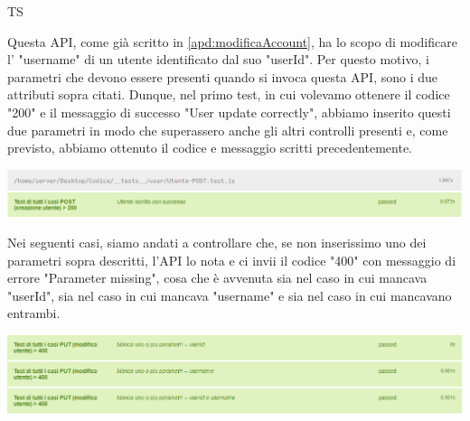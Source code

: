 \begin{listaPersonale}{TS}
\begin{center}
                \end{center}
                Questa API, come già scritto in \ref{apd:modificaAccount}, ha lo scopo di modificare l' "username" di un utente identificato dal suo "userId". Per questo motivo, i parametri che devono essere presenti quando si invoca questa API, sono i due attributi sopra citati. Dunque, nel primo test, in cui volevamo ottenere il codice "200" e il messaggio di successo "User update correctly", abbiamo inserito questi due parametri in modo che superassero anche gli altri controlli presenti e, come previsto, abbiamo ottenuto il codice e messaggio scritti precedentemente.
                \begin{center}
                        \includegraphics[width=1\textwidth, height=0.08\textheight]{img/png/tests/UtentePost/200_postUtente.png}
                \end{center}
                Nei seguenti casi, siamo andati a controllare che, se non inserissimo uno dei parametri sopra descritti, l'API lo nota e ci invii il codice "400" con messaggio di errore "Parameter missing", cosa che è avvenuta sia nel caso in cui mancava "userId", sia nel caso in cui mancava "username" e sia nel caso in cui mancavano entrambi.
                \begin{center}
                        \includegraphics[width=1\textwidth, height=0.13\textheight]{img/png/tests/UtentePut/400_missingParameter_putUtente.png}

\end{center}
\end{listaPersonale}
